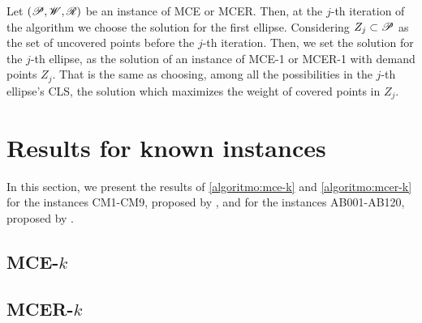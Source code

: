 Let $(\mathscr{P}, \mathscr{W}, \mathscr{R})$ be an instance of MCE or MCER. Then, at the $j$-th iteration of the algorithm we choose the solution for the first ellipse. Considering $Z_j \subset \mathscr{P}$ as the set of uncovered points before the $j$-th iteration. Then, we set the solution for the $j$-th ellipse, as the solution of an instance of MCE-1 or MCER-1 with demand points $Z_j$.
That is the same as choosing, among all the possibilities in the $j$-th ellipse's CLS, the solution which maximizes the weight of covered points in $Z_j$.

\section{Results for known instances}

In this section, we present the results of \autoref{algoritmo:mce-k} and \autoref{algoritmo:mcer-k} for the instances CM1-CM9, proposed by , and for the instances AB001-AB120, proposed by .

\subsection{MCE-$k$}

\subsection{MCER-$k$}

\begin{table}[H]\label{tab:mcer-results}
	\begin{center}
	\end{center}
\end{table}

